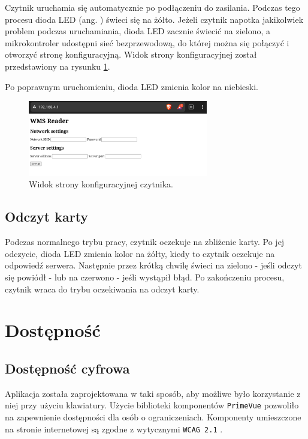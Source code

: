 Czytnik uruchamia się automatycznie po podłączeniu do zasilania. Podczas tego procesu dioda LED (ang. ) świeci się na żółto. Jeżeli czytnik napotka jakikolwiek problem podczas uruchamiania, dioda LED zacznie świecić na zielono, a mikrokontroler udostępni sieć bezprzewodową, do której można się połączyć i otworzyć stronę konfiguracyjną. Widok strony konfiguracyjnej został przedstawiony na rysunku \ref{fig:readerConfig}.

Po poprawnym uruchomieniu, dioda LED zmienia kolor na niebieski.

\begin{figure}[H]
    \centering
    \includegraphics[width=0.7\textwidth, frame]{graf/readerSetup.jpg}
    \caption{Widok strony konfiguracyjnej czytnika.}
    \label{fig:readerConfig}
\end{figure}

\subsection{Odczyt karty}

Podczas normalnego trybu pracy, czytnik oczekuje na zbliżenie karty. Po jej odczycie, dioda LED zmienia kolor na żółty, kiedy to czytnik oczekuje na odpowiedź serwera. Następnie przez krótką chwilę świeci na zielono - jeśli odczyt się powiódł - lub na czerwono - jeśli wystąpił błąd. Po zakończeniu procesu, czytnik wraca do trybu oczekiwania na odczyt karty.

\section{Dostępność}

\subsection{Dostępność cyfrowa}

Aplikacja została zaprojektowana w taki sposób, aby możliwe było korzystanie z niej przy użyciu klawiatury. Użycie biblioteki komponentów \texttt{PrimeVue} pozwoliło na zapewnienie dostępności dla osób o ograniczeniach. Komponenty umieszczone na stronie internetowej są zgodne z wytycznymi \texttt{WCAG 2.1} \cite{bib:WCAG21}.

